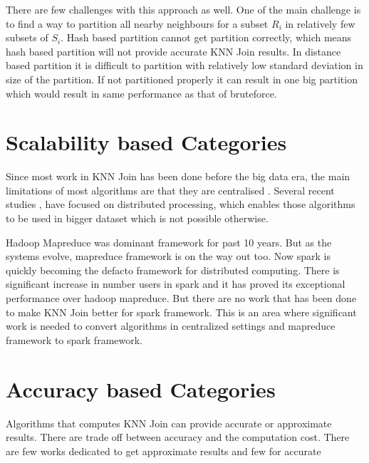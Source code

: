 \medskip

There are few challenges with this approach as well. One
of the main challenge is to find a way to partition all nearby neighbours for a subset
$R_i$ in relatively few subsets of $S_i$. Hash based partition cannot
get partition correctly, which means hash based partition will not
provide accurate KNN Join results. In distance based partition it is difficult to partition
with relatively low standard deviation in size of the partition. If
not partitioned properly it can result in one big partition which
would result in same performance as that of bruteforce.

\bigskip


\section{Scalability based Categories}

Since most work in KNN Join has been done before the big data era,
the main limitations of most algorithms are that they are centralised
\cite{jagadish_idistance:_2005} \cite{xia_gorder:_2004}
\cite{bohm_k-nearest_2004} \cite{kuan_fast_1997} \cite{yu_high-dimensional_2010}.
Several recent studies \cite{stupar_rankreduceprocessing_2010},
\cite{lu_efficient_2012} have focused on distributed
processing, which enables those algorithms to be used in bigger
dataset which is not possible otherwise.

\medskip

Hadoop Mapreduce was dominant framework for past 10 years. But as the
systems evolve, mapreduce framework is on the way out
too. Now spark is quickly becoming the defacto framework for
distributed computing. There is significant increase in number users
in spark and it has proved its exceptional performance over
hadoop mapreduce. But there are no work that has been done to make
KNN Join better for spark framework. This is an area where significant
work is needed to convert algorithms in centralized settings and mapreduce framework  to spark
framework.

\section{Accuracy based Categories}
Algorithms that computes KNN Join can provide accurate or approximate results. There
are trade off between accuracy and the computation cost. There are few
works dedicated to get approximate results \cite{stupar_rankreduceprocessing_2010}
\cite{zhang_efficient_2012} and few for accurate
\cite{jagadish_idistance:_2005} \cite{xia_gorder:_2004}
\cite{lu_efficient_2012}

